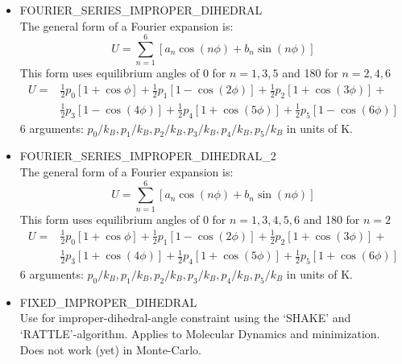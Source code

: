 \begin{itemize}
  \item{FOURIER\_SERIES\_IMPROPER\_DIHEDRAL}\\
  The general form of a Fourier expansion is:
  \begin{equation}
  U=\sum_{n=1}^6\left[a_n\cos\left(n\phi\right)+b_n\sin\left(n\phi\right)\right]
  \end{equation}
  This form uses equilibrium angles of 0 for $n=1,3,5$ and 180 for $n=2,4,6$
  \begin{equation}
  \begin{split}
  U=&\frac{1}{2}p_0\left[1+\cos\phi\right]+
    \frac{1}{2}p_1\left[1-\cos\left(2\phi\right)\right]+
    \frac{1}{2}p_2\left[1+\cos\left(3\phi\right)\right]+\\
    &\frac{1}{2}p_3\left[1-\cos\left(4\phi\right)\right]+
    \frac{1}{2}p_4\left[1+\cos\left(5\phi\right)\right]+
    \frac{1}{2}p_5\left[1-\cos\left(6\phi\right)\right]
  \end{split}
  \end{equation}
  6 arguments: $p_0/k_B,p_1/k_B,p_2/k_B,p_3/k_B,p_4/k_B,p_5/k_B$ in units of K.

  \item{FOURIER\_SERIES\_IMPROPER\_DIHEDRAL\_2}\\  The general form of a Fourier expansion is:
  \begin{equation}
  U=\sum_{n=1}^6\left[a_n\cos\left(n\phi\right)+b_n\sin\left(n\phi\right)\right]
  \end{equation}
  This form uses equilibrium angles of 0 for $n=1,3,4,5,6$ and 180 for $n=2$
  \begin{equation}
  \begin{split}
  U=&\frac{1}{2}p_0\left[1+\cos\phi\right]+
    \frac{1}{2}p_1\left[1-\cos\left(2\phi\right)\right]+
    \frac{1}{2}p_2\left[1+\cos\left(3\phi\right)\right]+\\
    &\frac{1}{2}p_3\left[1+\cos\left(4\phi\right)\right]+
    \frac{1}{2}p_4\left[1+\cos\left(5\phi\right)\right]+
    \frac{1}{2}p_5\left[1+\cos\left(6\phi\right)\right]
  \end{split}
  \end{equation}
  6 arguments: $p_0/k_B,p_1/k_B,p_2/k_B,p_3/k_B,p_4/k_B,p_5/k_B$ in units of K.
  \item{FIXED\_IMPROPER\_DIHEDRAL}\\
   Use for improper-dihedral-angle constraint using the `SHAKE' and `RATTLE'-algorithm.      
   Applies to Molecular Dynamics and minimization. Does not work (yet) in Monte-Carlo.

\end{itemize}


